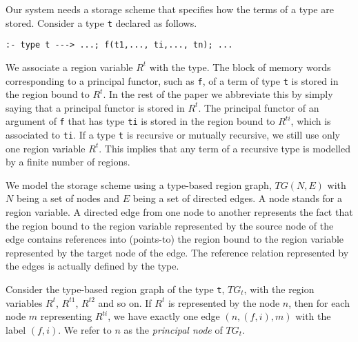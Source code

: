 \documentclass{tlp}
\def\TG{\mathit{TG}}
\newcommand{\code}[1]{{\tt#1}}
\begin{document}
Our system needs a storage scheme
that specifies how the terms of a type are stored.
Consider a type \code{t} declared as follows.
\begin{verbatim}
:- type t ---> ...; f(t1,..., ti,..., tn); ...
\end{verbatim}
We associate a region variable $R^t$ with the type.
The block of memory words corresponding to a principal functor,
such as \code{f}, of a term of type \code{t}
is stored in the region bound to $R^t$.
In the rest of the paper we abbreviate this by simply saying that
a principal functor is stored in $R^t$.
The principal functor of an argument of \code{f} that has type \code{ti}
is stored in the region bound to $R^{ti}$,
which is associated to \code{ti}.
If a type \code{t} is recursive or mutually recursive,
we still use only one region variable $R^t$.
This implies that any term of a recursive type
is modelled by a finite number of regions.

We model the storage scheme using a type-based region graph,
$\TG(N,E)$ with $N$ being a set of nodes and $E$ being a set of directed edges.
A node stands for a region variable.
A directed edge from one node to another represents the fact that
the region bound to the region variable
represented by the source node of the edge
contains references into (points-to)
the region bound to the region variable
represented by the target node of the edge.
The reference relation represented by the edges
is actually defined by the type.

Consider the type-based region graph of the type \code{t}, $\TG_t$,
with the region variables $R^t$, $R^{t1}$, $R^{t2}$ and so on.
If $R^t$ is represented by the node $n$,
then for each node $m$ representing $R^{ti}$,
we have exactly one edge $(n, (f,i), m)$ with the label $(f,i)$.
We refer to $n$ as the \emph{principal node} of $\TG_t$.
\end{document}
